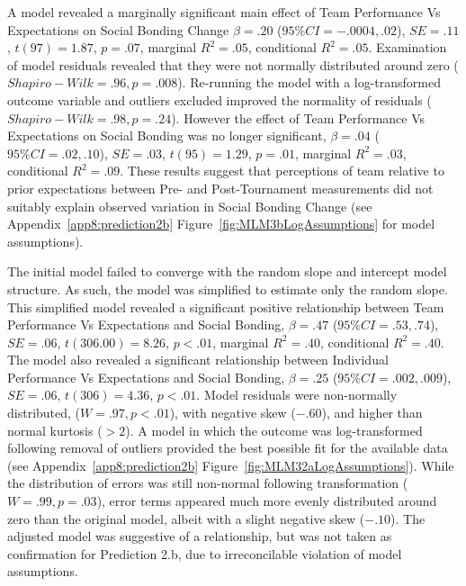 \begin{CJK}{UTF8}{gbsn}
  A model revealed a marginally significant main effect of Team Performance Vs Expectations on Social Bonding Change $\beta = .20$ ($95\% CI =  -.0004, .02$), $SE = .11$, $t(97) = 1.87$, $p = .07$, marginal $R^2 = .05$, conditional $R^2 = .05$.  Examination of model residuals revealed that they were not normally distributed around zero ($Shapiro-Wilk = .96, p = .008$).  Re-running the model with a log-transformed outcome variable and outliers excluded improved the normality of residuals ($Shapiro-Wilk = .98, p = .24$).
  However the effect of Team Performance Vs Expectations on Social Bonding was no longer significant, $\beta = .04$ ($95\% CI =  .02, .10$), $SE = .03$, $t(95) = 1.29$, $p = .01$, marginal $R^2 = .03$, conditional $R^2 = .09$.  These results suggest that perceptions of team relative to prior expectations between Pre- and Post-Tournament measurements did not suitably explain observed variation in Social Bonding Change (see Appendix~\ref{app8:prediction2b} Figure~\ref{fig:MLM3bLogAssumptions} for model assumptions).



  The initial model failed to converge with the random slope and intercept model structure.  As such, the model was simplified to estimate only the random slope. This simplified model revealed a significant positive relationship between Team Performance Vs Expectations and Social Bonding, $\beta = .47$ ($95\% CI =  .53, .74$), $SE = .06$, $t(306.00) = 8.26$, $p < .01$, marginal $R^2 = .40$, conditional $R^2 = .40$.  The model also revealed a significant relationship between Individual Performance Vs Expectations and Social Bonding, $\beta = .25$ ($95\% CI =  .002, .009$), $SE = .06$, $t(306) = 4.36$, $p < .01$.  Model residuals were non-normally distributed, ($W = .97, p < .01$), with negative skew ($-.60$), and higher than normal kurtosis ($> 2$).  A model in which the outcome was log-transformed following removal of outliers provided the best possible fit for the available data (see Appendix~\ref{app8:prediction2b} Figure~\ref{fig:MLM32aLogAssumptions}).  While the distribution of errors was still non-normal following transformation ($W = .99, p = .03$),  error terms appeared much more evenly distributed around zero than the original model, albeit with a slight negative skew ($-.10$).
  The adjusted model was suggestive of a relationship, but was not taken as confirmation for Prediction 2.b, due to irreconcilable violation of model assumptions.


\end{CJK}
